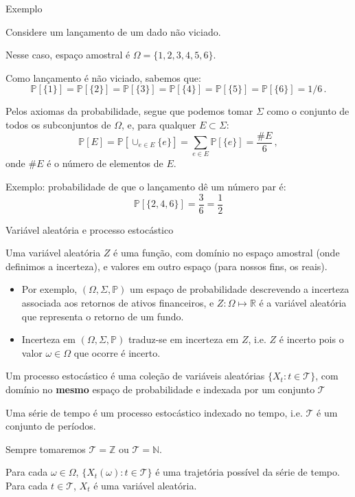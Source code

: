 \documentclass[11pt]{beamer}
\newenvironment{halfwideitemize}{\itemize\addtolength{\itemsep}{0.5em}}{\enditemize}
\begin{document}
	\begin{frame}{Exemplo}
		\begin{halfwideitemize}
			\item Considere um lançamento de um dado não viciado.
			\item Nesse caso, espaço amostral é $\Omega = \{1,2,3,4,5,6\}$.
			\item Como lançamento é não viciado, sabemos que:
			$$\mathbb{P}[\{1\}]= \mathbb{P}[\{2\}] = \mathbb{P}[\{3\}] = \mathbb{P}[\{4\}] = \mathbb{P}[\{5\}] = \mathbb{P}[\{6\}] = 1/6 \,.$$
			\item Pelos axiomas da probabilidade, segue que podemos tomar $\Sigma$ como o conjunto de todos os subconjuntos de $\Omega$, e, para qualquer $E\subset \Sigma$:
			$$\mathbb{P}[E]= \mathbb{P}[\cup_{e \in E}\{e\}] = \sum_{e \in E}\mathbb{P}[\{e\}] = \frac{\# E}{6}\, ,$$
			onde $\# E$ é o número de elementos de $E$.
			\item Exemplo: probabilidade de que o lançamento dê um número par é:
			$$\mathbb{P}[\{2,4,6\}]= \frac{3}{6} = \frac{1}{2}$$
		\end{halfwideitemize}
	\end{frame}
	
	
	\begin{frame}{Variável aleatória e processo estocástico}
		\begin{halfwideitemize}
			\item Uma {\color{blue}variável aleatória} $Z$ é uma {\color{blue}função}, com domínio no espaço amostral (onde definimos a incerteza), e valores em outro espaço (para nossos fins, os reais).
			\begin{itemize}
				\item Por exemplo, $(\Omega, \Sigma, \mathbb{P})$ um espaço de probabilidade descrevendo a incerteza associada aos retornos de ativos financeiros, e $Z: \Omega \mapsto \mathbb{R}$ é a variável aleatória que representa o retorno de um fundo.
				\item Incerteza em $(\Omega, \Sigma, \mathbb{P})$ traduz-se em incerteza em $Z$, i.e. $Z$ é incerto pois o valor $\omega \in \Omega$ que ocorre é incerto.
			\end{itemize}
			\item Um {\color{blue} processo estocástico} é uma coleção de variáveis aleatórias $\{X_t: t \in \mathcal{T}\}$, com domínio no \textbf{mesmo} espaço de probabilidade e indexada por um conjunto $\mathcal{T}$
			\item Uma {\color{blue}série de tempo} é um processo estocástico indexado no tempo, i.e. $\mathcal{T}$ é um conjunto de períodos.
			\begin{halfwideitemize}
				\item Sempre tomaremos $\mathcal{T} = \mathbb{Z}$ ou $\mathcal{T}  =\mathbb{N}$.
				\item Para cada $\omega \in \Omega$, $\{ X_t(\omega): t \in \mathcal{T} \}$ é uma trajetória {\color{blue}possível} da série de tempo. Para cada $t \in \mathcal{T}$, $X_t$ é uma variável aleatória.
			\end{halfwideitemize}
		\end{halfwideitemize}
	\end{frame}
	
\end{document}
